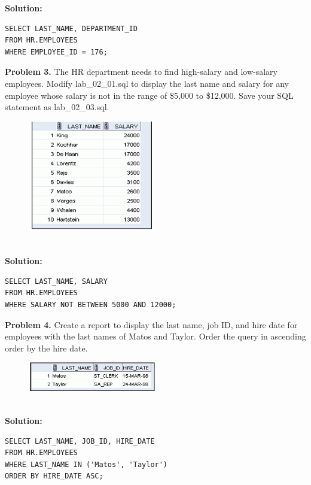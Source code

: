 \documentclass[12pt,a4paper]{article}
\begin{document}
\textbf{Solution:}
\begin{lstlisting}[style=sqlstyle]
SELECT LAST_NAME, DEPARTMENT_ID
FROM HR.EMPLOYEES
WHERE EMPLOYEE_ID = 176;
\end{lstlisting}

\vspace{0.5cm}

\textbf{Problem 3.} The HR department needs to find high-salary and low-salary employees. Modify lab\_02\_01.sql to display the last name and salary for any employee whose salary is not in the range of \$5,000 to \$12,000. Save your SQL statement as lab\_02\_03.sql.

\begin{figure}[htbp]
  \centering
  \includegraphics[width=0.5\textwidth]{Screenshots/23.png}
\end{figure}\\

\textbf{Solution:}
\begin{lstlisting}[style=sqlstyle]
SELECT LAST_NAME, SALARY
FROM HR.EMPLOYEES
WHERE SALARY NOT BETWEEN 5000 AND 12000;
\end{lstlisting}

\vspace{0.5cm}

\textbf{Problem 4.} Create a report to display the last name, job ID, and hire date for employees with the last names of Matos and Taylor. Order the query in ascending order by the hire date.
\begin{figure}[htbp]
  \centering
  \includegraphics[width=0.5\textwidth]{Screenshots/24.png}
\end{figure}\\
\textbf{Solution:}
\begin{lstlisting}[style=sqlstyle]
SELECT LAST_NAME, JOB_ID, HIRE_DATE
FROM HR.EMPLOYEES
WHERE LAST_NAME IN ('Matos', 'Taylor')
ORDER BY HIRE_DATE ASC;
\end{lstlisting}
\end{document}
